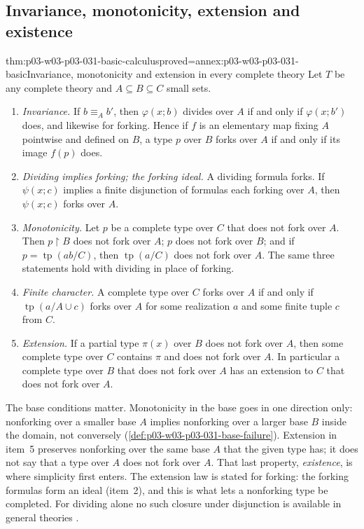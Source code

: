 \subsection{Invariance, monotonicity, extension and existence}
\label{sec:p03-w03-p03-031-laws}

\begin{hbtheorem}{thm:p03-w03-p03-031-basic-calculus}{proved=annex:p03-w03-p03-031-basic}{Invariance, monotonicity and extension in every complete theory}
Let \(T\) be any complete theory and \(A\subseteq B\subseteq C\) small sets.
\begin{enumerate}
  \item \emph{Invariance.}  If \(b\equiv_A b'\), then \(\varphi(x;b)\)
        divides over \(A\) if and only if \(\varphi(x;b')\) does, and
        likewise for forking.  Hence if \(f\) is an elementary map fixing
        \(A\) pointwise and defined on \(B\), a type \(p\) over \(B\) forks
        over \(A\) if and only if its image \(f(p)\) does.
  \item \emph{Dividing implies forking; the forking ideal.}  A dividing
        formula forks.  If \(\psi(x;c)\) implies a finite disjunction of
        formulas each forking over \(A\), then \(\psi(x;c)\) forks over
        \(A\).
  \item \emph{Monotonicity.}  Let \(p\) be a complete type over \(C\) that
        does not fork over \(A\).  Then \(p\mathbin{\upharpoonright}B\) does
        not fork over \(A\); \(p\) does not fork over \(B\); and if
        \(p=\operatorname{tp}(ab/C)\), then \(\operatorname{tp}(a/C)\) does
        not fork over \(A\).  The same three statements hold with dividing
        in place of forking.
  \item \emph{Finite character.}  A complete type over \(C\) forks over
        \(A\) if and only if \(\operatorname{tp}(a/A\cup c)\) forks over
        \(A\) for some realization \(a\) and some finite tuple \(c\) from
        \(C\).
  \item \emph{Extension.}  If a partial type \(\pi(x)\) over \(B\) does
        not fork over \(A\), then some complete type over \(C\) contains
        \(\pi\) and does not fork over \(A\).  In particular a complete
        type over \(B\) that does not fork over \(A\) has an extension to
        \(C\) that does not fork over \(A\).
\end{enumerate}
\end{hbtheorem}

The base conditions matter.  Monotonicity in the base goes in one
direction only: nonforking over a smaller base \(A\) implies nonforking
over a larger base \(B\) inside the domain, not conversely
(\cref{def:p03-w03-p03-031-base-failure}).  Extension in item~5 preserves
nonforking over the same base \(A\) that the given type has; it does not
say that a type over \(A\) does not fork over \(A\).  That last property,
\emph{existence}, is where simplicity first enters.  The extension law is
stated for forking: the forking formulas form an ideal (item~2), and this
is what lets a nonforking type be completed.  For dividing alone no such
closure under disjunction is available in general theories
\cite[p.~267]{Casanovas2007Simplicity}.

